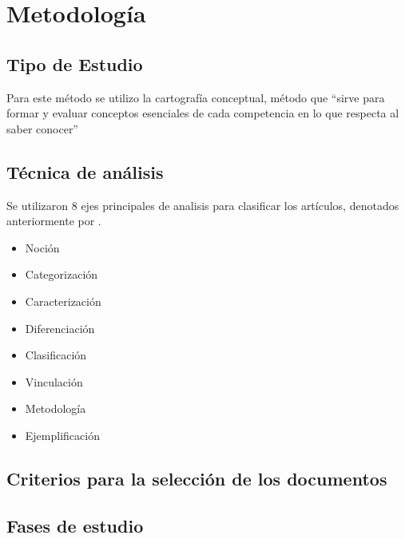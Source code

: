 \section{Metodología}
\subsection{Tipo de Estudio}
Para este método se utilizo la cartografía conceptual, método que “sirve para formar y evaluar conceptos esenciales de cada competencia en lo que respecta al saber conocer” \parencite[][p. 16]{tobon2012} 
\subsection{Técnica de análisis}
Se utilizaron 8 ejes principales de analisis para clasificar los artículos, denotados anteriormente por \textcite{tobon2012} .
\begin{itemize}
   \item Noción
   \item Categorización
   \item Caracterización
   \item Diferenciación
   \item Clasificación
   \item Vinculación
   \item Metodología
   \item Ejemplificación
\end{itemize}



\subsection{Criterios para la selección de los documentos}
\subsection{Fases de estudio}

%
%

